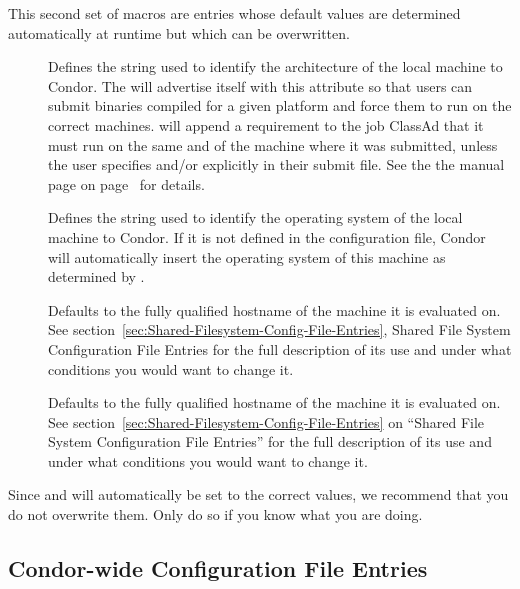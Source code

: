 This second set of macros are entries whose default values are
determined automatically at runtime but which can be overwritten.  
\begin{description}

\item[] \label{param:Arch}
  Defines the string
  used to identify the architecture of the local machine to Condor.
  The  will advertise itself with this attribute so
  that users can submit binaries compiled for a given platform and
  force them to run on the correct machines.   will
  append a requirement to the job ClassAd that it must
  run on the same  and  of the machine where
  it was submitted, unless the user specifies  and/or
   explicitly in their submit file.  See the
  the  manual page
  on page~\pageref{man-condor-submit} for details.

\item[] \label{param:OpSys}
  Defines the
  string used to identify the operating system of the local machine to
  Condor.
  If it is not defined in the configuration file, Condor will
  automatically insert the operating system of this machine as
  determined by .

\item[]
  Defaults to the fully
  qualified hostname of the machine it is evaluated on.  See
  section~\ref{sec:Shared-Filesystem-Config-File-Entries}, Shared
  File System Configuration File Entries for the full description of
  its use and under what conditions you would want to change it.

\item[]
  Defaults to the fully
  qualified hostname of the machine it is evaluated on.  See
  section~\ref{sec:Shared-Filesystem-Config-File-Entries} on ``Shared
  File System Configuration File Entries'' for the full description of
  its use and under what conditions you would want to change it.

\end{description}

Since  and  will automatically be set to the
correct values, we recommend that you do not overwrite them.
Only do so if you know what you are doing.
  

\subsection{\label{sec:Condor-wide-Config-File-Entries}
Condor-wide Configuration File Entries}

